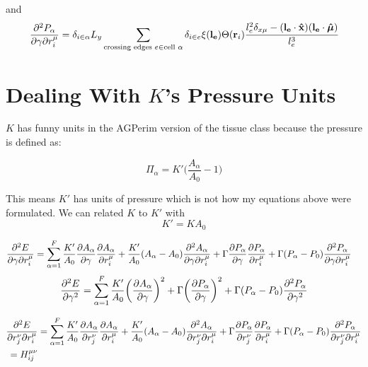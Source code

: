 \documentclass[12pt,a4paper]{article}
\begin{document}
and 
\begin{align}
	\label{eqn: dPdgammadr_resum}
	\pdv{P_\alpha}{\gamma}{r_i^\mu} &=  \delta_{i \in \alpha} L_y \sum\limits_{ \text{crossing edges } e \in \text{cell } \alpha} \delta_{i\in e} \xi(\vb{l_e}) \Theta(\vb{r}_i)\cfrac{ l_e^2\delta_{x \mu} - (\vb{l_e}\cdot \vu{x}) (\vb{l_e}\cdot \vu*{\mu})}{l_e^3}\\
\end{align}

\section{Dealing With $K$'s Pressure Units}

$K$ has funny units in the AGPerim version of the tissue class because the pressure is defined as:

\begin{equation}
	\Pi_{\alpha} = K' \bigg(\frac{A_{\alpha}}{A_0} - 1\bigg)
\end{equation}

This means $K'$ has units of pressure which is not how my equations above were formulated. We can related $K$ to $K'$ with 
\begin{equation}
K' = K A_0
\end{equation}

\begin{align}
	\label{eqn: dedgammadr22}
	\pdv[2]{E}{\gamma}{r_i^\mu} &= \sum\limits_{\alpha=1}^{F} \frac{K'}{A_0} \pdv{A_\alpha}{\gamma} \pdv{A_\alpha}{r_i^\mu} + \frac{K'}{A_0} (A_\alpha - A_0) \pdv{A_\alpha}{\gamma}{r_i^\mu} + \Gamma \pdv{P_\alpha}{\gamma} \pdv{P_\alpha}{r_i^\mu} + \Gamma (P_\alpha - P_0)  \pdv[2]{P_{\alpha}}{\gamma}{r_i^\mu} 
\end{align}
\begin{align}
	\label{eqn: dedgammadgamma_simplified22}
	\pdv[2]{E}{\gamma} &= \sum\limits_{\alpha=1}^{F}\frac{K'}{A_0} \bigg(\pdv{A_\alpha}{\gamma}\bigg)^2  + \Gamma \bigg(\pdv{P_\alpha}{\gamma}\bigg)^2 + \Gamma (P_\alpha - P_0)  \pdv[2]{P_{\alpha}}{\gamma} \\
\end{align}

\begin{align}
	\label{eqn: Hessian2}
	\pdv[2]{E}{r_j^\nu}{r_i^\mu} &= \sum\limits_{\alpha=1}^{F}\frac{K'}{A_0} \pdv{A_\alpha}{r_j^\nu} \pdv{A_\alpha}{r_i^\mu} + \frac{K'}{A_0} (A_\alpha - A_0) \pdv[2]{A_\alpha}{r_j^\nu}{r_i^\mu} + \Gamma \pdv{P_\alpha}{r_j^\nu} \pdv{P_\alpha}{r_i^\mu} + \Gamma (P_\alpha - P_0)  \pdv[2]{P_{\alpha}}{r_j^\nu}{r_i^\mu} \\
	= H_{ij}^{\mu \nu}
\end{align}
\end{document}
